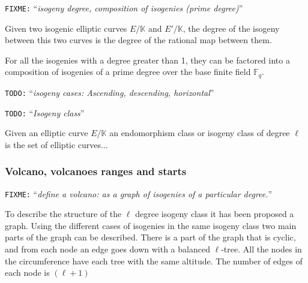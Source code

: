 \documentclass[10pt,a4paper,twoside]{llncs}
\newcommand{\todo}[1]{\texttt{\color{red}TODO:} ``\emph{#1}''}
\newcommand{\fixme}[1]{\texttt{\color{red}FIXME:} ``\emph{#1}''}
\newcommand{\Fq}{\ensuremath{\mathbb{F}_q}}%
\begin{document}
\fixme{isogeny degree,
 composition of isogenies (prime degree)}

\begin{definition}\label{def:iso_degree}
 Given two isogenic elliptic curves $E/\mathbb{K}$ and $E'/\mathbb{K}$, the degree of the isogeny between this two curves is the degree of the rational map between them.
\end{definition}

For all the isogenies with a degree greater than 1, they can be factored into a composition of isogenies of a prime degree over the base finite field \Fq.

\todo{isogeny cases: Ascending, descending, horizontal}

\todo{Isogeny class}
\begin{definition}\label{def_iso_class}
 Given an elliptic curve $E/\mathbb{K}$ an endomorphism class or isogeny class of degree $\ell$ is the set of elliptic curves... 
\end{definition}

\subsubsection{Volcano, volcanoes ranges and starts \label{sec:volcano}}

\fixme{define a volcano: as a graph of isogenies of a particular degree.}

To describe the structure of the $\ell$ degree isogeny class it has been proposed a graph. Using the different cases of isogenies in the same isogeny class two main parts of the graph can be described. There is a part of the graph that is cyclic, and from each node an edge goes down with a balanced $\ell$-tree. All the nodes in the circumference have each tree with the same altitude. The number of edges of each node is $(\ell+1)$
\end{document}
